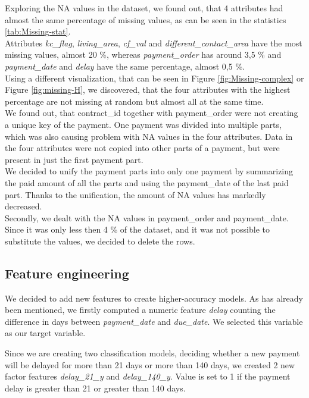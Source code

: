 \documentclass[
]{article}
\begin{document}
Exploring the NA values in the dataset, we found out, that 4 attributes had
almost the same percentage of missing values, as can be seen in the statistics \ref{tab:Missing-stat}.\\
Attributes \emph{kc\_flag}, \emph{living\_area}, \emph{cf\_val} and \emph{different\_contact\_area} have the most missing values, almost 20 \%, whereas \emph{payment\_order} has around 3,5 \% and \emph{payment\_date} and \emph{delay} have the same percentage, almost 0,5 \%.\\
Using a different visualization, that can be seen in Figure \ref{fig:Missing-complex} or Figure \ref{fig:missing-H}, we discovered, that the four attributes with the highest percentage are
not missing at random but almost all at the same time.\\
We found out, that contract\_id together with payment\_order were not creating a unique key of the payment. One payment was divided into multiple parts, which was also causing problem with NA values in the four attributes. Data in the four attributes were not copied into other parts of a payment, but were present in just the first payment part.\\
We decided to unify the payment parts into only one payment by summarizing the paid amount of all the parts and using the payment\_date of the last paid part. Thanks to the unification, the amount of NA values has markedly decreased.\\
Secondly, we dealt with the NA values in payment\_order and payment\_date. Since it was only less then 4 \% of the dataset, and it was not possible to substitute the values, we decided to delete the rows.

\hypertarget{feature-engineering}{%
\subsection{Feature engineering}\label{feature-engineering}}

We decided to add new features to create higher-accuracy models. As has already been mentioned, we firstly computed a numeric feature \emph{delay} counting the difference in days between \emph{payment\_date} and \emph{due\_date}. We selected this variable as our target variable.

Since we are creating two classification models, deciding whether a new payment will be delayed for more than 21 days or more than 140 days, we created 2 new factor features \emph{delay\_21\_y} and \emph{delay\_140\_y}. Value is set to 1 if the payment delay is greater than 21 or greater than 140 days.
\end{document}
